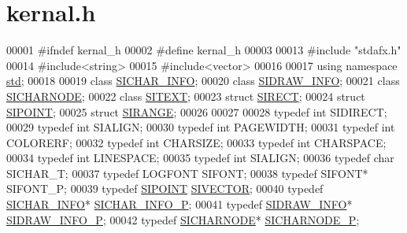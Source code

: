 \hypertarget{kernal_8h_source}{}\section{kernal.\+h}
\label{kernal_8h_source}

\begin{DoxyCode}
00001 \textcolor{preprocessor}{#ifndef kernal\_h}
00002 \textcolor{preprocessor}{#define kernal\_h}
00003 
00013 \textcolor{preprocessor}{#include "stdafx.h"}
00014 \textcolor{preprocessor}{#include<string>}
00015 \textcolor{preprocessor}{#include<vector>}
00016 
00017 \textcolor{keyword}{using namespace }\hyperlink{namespacestd}{std};
00018 
00019 \textcolor{keyword}{class }\hyperlink{class_s_i_c_h_a_r___i_n_f_o}{SICHAR\_INFO};
00020 \textcolor{keyword}{class }\hyperlink{class_s_i_d_r_a_w___i_n_f_o}{SIDRAW\_INFO};
00021 \textcolor{keyword}{class }\hyperlink{class_s_i_c_h_a_r_n_o_d_e}{SICHARNODE};
00022 \textcolor{keyword}{class }\hyperlink{class_s_i_t_e_x_t}{SITEXT};
00023 \textcolor{keyword}{struct }\hyperlink{struct_s_i_r_e_c_t}{SIRECT};
00024 \textcolor{keyword}{struct }\hyperlink{struct_s_i_p_o_i_n_t}{SIPOINT};
00025 \textcolor{keyword}{struct }\hyperlink{struct_s_i_r_a_n_g_e}{SIRANGE};
00026 
00027 
00028 \textcolor{keyword}{typedef} \textcolor{keywordtype}{int} SIDIRECT;
00029 \textcolor{keyword}{typedef} \textcolor{keywordtype}{int} SIALIGN;
00030 \textcolor{keyword}{typedef} \textcolor{keywordtype}{int} PAGEWIDTH;
00031 \textcolor{keyword}{typedef} \textcolor{keywordtype}{int} COLORERF;
00032 \textcolor{keyword}{typedef} \textcolor{keywordtype}{int} CHARSIZE;
00033 \textcolor{keyword}{typedef} \textcolor{keywordtype}{int} CHARSPACE;
00034 \textcolor{keyword}{typedef} \textcolor{keywordtype}{int} LINESPACE;
00035 \textcolor{keyword}{typedef} \textcolor{keywordtype}{int} SIALIGN;
00036 \textcolor{keyword}{typedef} \textcolor{keywordtype}{char} SICHAR\_T;
00037 \textcolor{keyword}{typedef} LOGFONT SIFONT;
00038 \textcolor{keyword}{typedef} SIFONT* SIFONT\_P;
00039 \textcolor{keyword}{typedef} \hyperlink{struct_s_i_p_o_i_n_t}{SIPOINT} \hyperlink{struct_s_i_p_o_i_n_t}{SIVECTOR};
00040 \textcolor{keyword}{typedef} \hyperlink{class_s_i_c_h_a_r___i_n_f_o}{SICHAR\_INFO}* \hyperlink{class_s_i_c_h_a_r___i_n_f_o}{SICHAR\_INFO\_P};
00041 \textcolor{keyword}{typedef} \hyperlink{class_s_i_d_r_a_w___i_n_f_o}{SIDRAW\_INFO}* \hyperlink{class_s_i_d_r_a_w___i_n_f_o}{SIDRAW\_INFO\_P};
00042 \textcolor{keyword}{typedef} \hyperlink{class_s_i_c_h_a_r_n_o_d_e}{SICHARNODE}* \hyperlink{class_s_i_c_h_a_r_n_o_d_e}{SICHARNODE\_P};

\end{DoxyCode}

